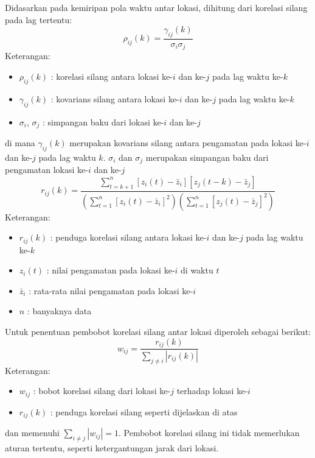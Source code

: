 \begin{enumerate}[label=\alph*)]
    Didasarkan pada kemiripan pola waktu antar lokasi, dihitung dari korelasi silang pada lag tertentu:
    \begin{equation}\label{swm_korelasi}
        \rho_{ij}(k) = \frac{\gamma_{ij}(k)}{\sigma_i \sigma_j}
    \end{equation}
    Keterangan:
    \begin{itemize}
        \item $\rho_{ij}(k)$ : korelasi silang antara lokasi ke-$i$ dan ke-$j$ pada lag waktu ke-$k$
        \item $\gamma_{ij}(k)$ : kovarians silang antara lokasi ke-$i$ dan ke-$j$ pada lag waktu ke-$k$
        \item $\sigma_i$, $\sigma_j$ : simpangan baku dari lokasi ke-$i$ dan ke-$j$
    \end{itemize}
    
    di mana $\gamma_{ij}(k)$ merupakan kovarians silang antara pengamatan pada lokasi ke-$i$ dan ke-$j$ pada lag waktu $k$. $\sigma_i$ dan $\sigma_j$ merupakan simpangan baku dari pengamatan lokasi ke-$i$ dan ke-$j$
    \begin{equation}\label{swm_korelasi2}
         r_{ij}(k) = \frac{\sum_{t=k+1}^{n} [z_i(t)-\bar{z}_i][z_j(t-k)-\bar{z}_j]}{\left( \sum_{t=1}^{n} [z_i(t)-\bar{z}_i]^2 \right) \left( \sum_{t=1}^{n} [z_j(t)-\bar{z}_j]^2 \right)}
    \end{equation}
    Keterangan:
    \begin{itemize}
        \item $r_{ij}(k)$ : penduga korelasi silang antara lokasi ke-$i$ dan ke-$j$ pada lag waktu ke-$k$
        \item $z_i(t)$ : nilai pengamatan pada lokasi ke-$i$ di waktu $t$
        \item $\bar{z}_i$ : rata-rata nilai pengamatan pada lokasi ke-$i$
        \item $n$ : banyaknya data
    \end{itemize}

    Untuk penentuan pembobot korelasi silang antar lokasi diperoleh sebagai berikut:
    \begin{equation}\label{swm_korelasi3}
        w_{ij} = \frac{r_{ij}(k)}{\sum_{j \neq i} |r_{ij}(k)|}
    \end{equation}
    Keterangan:
    \begin{itemize}
        \item $w_{ij}$ : bobot korelasi silang dari lokasi ke-$j$ terhadap lokasi ke-$i$
        \item $r_{ij}(k)$ : penduga korelasi silang seperti dijelaskan di atas
    \end{itemize}

    dan memenuhi $\sum_{i \neq j} |w_{ij}| = 1$. Pembobot korelasi silang ini tidak memerlukan aturan tertentu, seperti ketergantungan jarak dari lokasi.
\end{enumerate}
